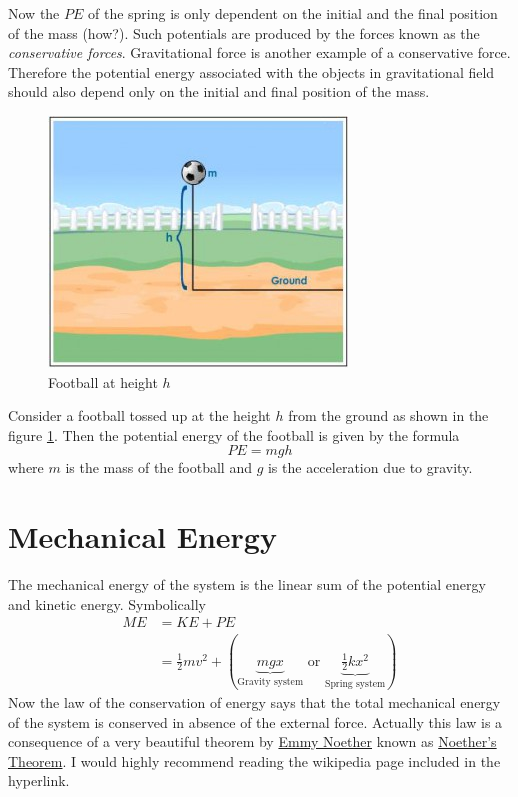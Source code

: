 \documentclass[10pt]{article}
\begin{document}
Now the $PE$ of the spring is only dependent on the initial and the final position of the mass (how?).  Such potentials are produced by the forces known as the \emph{conservative forces}.  Gravitational force is another example of a conservative force.  Therefore the potential energy associated with the objects in gravitational field should also depend only on the initial and final position of the mass.  

\begin{figure}[h]
\includegraphics[scale=.5]{potenergyfootball}
\centering
\caption{Football at height $h$}
\label{potfootball}
\centering
\end{figure}
Consider a football tossed up at the height $h$ from the ground as shown in the figure \ref{potfootball}.  Then the potential energy of the football is given by the formula
\begin{equation}
  PE = mgh
\end{equation}
where $m$ is the mass of the football and $g$ is the acceleration due to gravity.
\section{Mechanical Energy}
The mechanical energy of the system is the linear sum of the potential energy and kinetic energy.  Symbolically
\begin{equation}
\begin{split}
  ME &= KE + PE\\
&= \frac{1}{2}mv^2 + \left(\underbrace{mgx}_{\text{Gravity system}}\text{ or }\underbrace{\frac{1}{2}kx^2}_{\text{Spring system}}\right)
\end{split}
\end{equation}
Now the law of the conservation of energy says that the total mechanical energy of the system is conserved in absence of the external force.  Actually this law is a consequence of a very beautiful theorem by \href{https://en.wikipedia.org/wiki/Emmy_Noether}{Emmy Noether} known as \href{https://en.wikipedia.org/wiki/Noether%27s_theorem}{Noether's Theorem}.  I would highly recommend reading the wikipedia page included in the hyperlink. 
\end{document}
